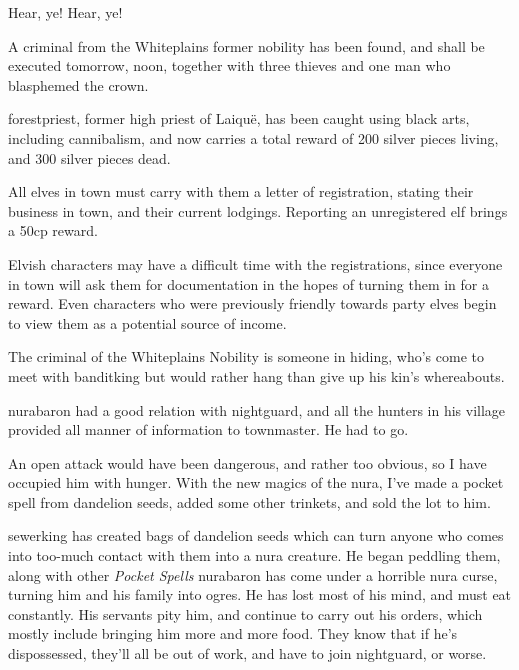\begin{multicols}{2}
\begin{speechtext}

	Hear, ye! Hear, ye!

	A criminal from the Whiteplains former nobility has been found, and shall be executed tomorrow, noon, together with three thieves and one man who blasphemed the crown.

	\Gls{forestpriest}, former high priest of Laiqu\"{e}, has been caught using black arts, including cannibalism, and now carries a total reward of 200 silver pieces living, and 300 silver pieces dead.

	All elves in \gls{town} must carry with them a letter of registration, stating their business in town, and their current lodgings.
	Reporting an unregistered elf brings a 50cp reward.

\end{speechtext}

Elvish characters may have a difficult time with the registrations, since everyone in \gls{town} will ask them for documentation in the hopes of turning them in for a reward.
Even characters who were previously friendly towards party elves begin to view them as a potential source of income.

The criminal of the Whiteplains Nobility is someone in hiding, who's come to meet with \gls{banditking} but would rather hang than give up his kin's whereabouts.

\stopcontents[sq]

\resumecontents[Town]

\label{desperatemeasures}

\stopcontents[Town]

\startcontents[sq]

\sqminitoc

\begin{speechtext}

  \Gls{nurabaron} had a good relation with \gls{nightguard}, and all the hunters in his village provided all manner of information to \gls{townmaster}.
  He had to go.

  An open attack would have been dangerous, and rather too obvious, so I have occupied him with hunger.
  With the new magics of the nura, I've made a pocket spell from dandelion seeds, added some other trinkets, and sold the lot to him.

\end{speechtext}

\noindent
\Gls{sewerking} has created bags of dandelion seeds which can turn anyone who comes into too-much contact with them into a nura creature.
He began peddling them, along with other \textit{Pocket Spells}%
\iftoggle{core}{\footnote{See the core book, page \pageref{pocketSpell}.}}{}
\gls{nurabaron} has come under a horrible nura curse, turning him and his family into ogres.
He has lost most of his mind, and must eat constantly.
His servants pity him, and continue to carry out his orders, which mostly include bringing him more and more food.
They know that if he's dispossessed, they'll all be out of work, and have to join \gls{nightguard}, or worse.


\end{multicols}
